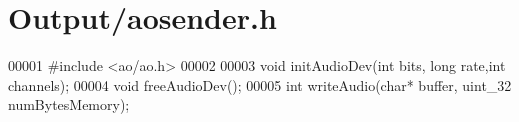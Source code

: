 \hypertarget{aosender_8h_source}{\section{\-Output/aosender.h}
}

\begin{DoxyCode}
00001 \textcolor{preprocessor}{#include <ao/ao.h>}
00002 
00003 \textcolor{keywordtype}{void} initAudioDev(\textcolor{keywordtype}{int} bits, \textcolor{keywordtype}{long} rate,\textcolor{keywordtype}{int} channels);
00004 \textcolor{keywordtype}{void} freeAudioDev();
00005 \textcolor{keywordtype}{int} writeAudio(\textcolor{keywordtype}{char}* buffer, uint\_32 numBytesMemory);
\end{DoxyCode}
